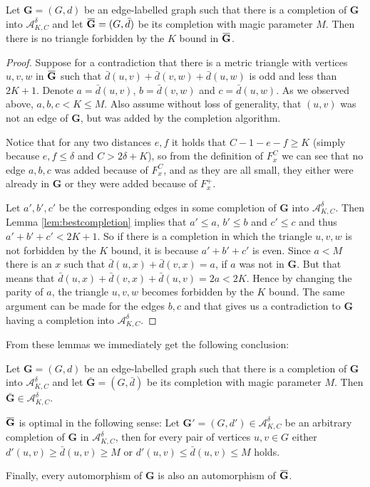 \documentclass[11pt]{amsart}
\newcommand{\overbar}[1]{\mkern 1.5mu\overline{\mkern-1.5mu#1\mkern-1.5mu}\mkern 1.5mu}
\def\str#1{\mathbf {#1}}
\begin{document}
\begin{lemma}
Let $\str{G}=(G,d)$ be an edge-labelled graph such that there is a completion of $\str{G}$ into $\mathcal A^\delta_{K,C}$ and let $\overbar{\str{G}}=(G,\bar{d})$ be its completion with magic parameter $M$. Then there is no triangle forbidden by the $K$ bound in $\overbar{\str{G}}$.
\end{lemma}
\begin{proof}
Suppose for a contradiction that there is a metric triangle with vertices $u,v,w$ in $\overbar{\str{G}}$ such that $\bar{d}(u,v)+\bar{d}(v,w)+\bar{d}(u,w)$ is odd and less than $2K+1$. Denote $a=\bar{d}(u,v)$, $b=\bar{d}(v,w)$ and $c=\bar{d}(u,w)$. As we observed above, $a,b,c < K\leq M$. Also assume without loss of generality, that $(u,v)$ was not an edge of $\str{G}$, but was added by the completion algorithm.

Notice that for any two distances $e,f$ it holds that $C-1-e-f \geq K$ (simply because $e,f\leq \delta$ and $C>2\delta+K$), so from the definition of $F_x^C$ we can see that no edge $a,b,c$ was added because of $F_x^C$, and as they are all small, they either were already in $\str{G}$ or they were added because of $F_x^+$.

Let $a',b',c'$ be the corresponding edges in some completion of $\str{G}$ into $\mathcal A^\delta_{K,C}$. Then Lemma \ref{lem:bestcompletion} implies that $a'\leq a$, $b'\leq b$ and $c'\leq c$ and thus $a'+b'+c'<2K+1$. So if there is a completion in which the triangle $u,v,w$ is not forbidden by the $K$ bound, it is because $a'+b'+c'$ is even. Since $a < M$ there is an $x$ such that $\bar{d}(u,x) + \bar{d}(v,x) = a$, if $a$ was not in $\str{G}$. But that means that $\bar{d}(u,x) + \bar{d}(v,x) + \bar{d}(u,v) = 2a < 2K$. Hence by changing the parity of $a$, the triangle $u,v,w$ becomes forbidden by the $K$ bound. The same argument can be made for the edges $b,c$ and that gives us a contradiction to $\str{G}$ having a completion into $\mathcal A^\delta_{K,C}$.
\end{proof}

From these lemmas we immediately get the following conclusion:

\begin{theorem} \label{thm:magiccompletion}
Let $\str{G}=(G,d)$ be an edge-labelled graph  such that there is a completion of $\str{G}$ into $\mathcal A^\delta_{K,C}$ and let $\bar{\str{G}}=(G,\bar{d})$ be its completion with magic parameter $M$. Then $\bar{\str{G}}\in\mathcal A^\delta_{K,C}$.

$\overbar{\str{G}}$ is optimal in the following sense:
Let $\str{G}'=(G,d')\in\mathcal A^\delta_{K,C}$ be an arbitrary completion of $\str{G}$ in  $\mathcal A^\delta_{K,C}$, then 
for every pair of vertices $u,v\in G$ either $d'(u,v) \geq \bar{d}(u,v) \geq M$ or $d'(u,v) \leq \bar{d}(u,v) \leq M$ holds.

Finally, every automorphism of $\str{G}$ is also an automorphism of $\overbar{\str{G}}$.
\end{theorem}
\end{document}
